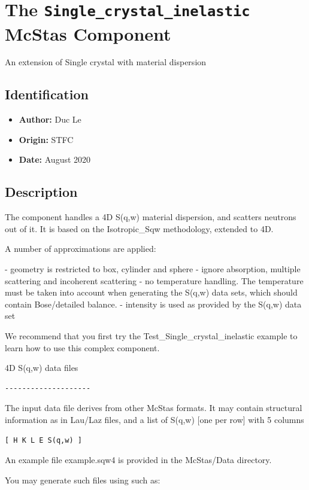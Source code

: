 \section{The \texttt{Single\_crystal\_inelastic} McStas Component}
An extension of Single crystal with material dispersion

\subsection*{Identification}
\begin{itemize}
  \item \textbf{Author:} Duc Le
  \item \textbf{Origin:} STFC
  \item \textbf{Date:} August 2020
\end{itemize}

\subsection*{Description}
The component handles a 4D S(q,w) material dispersion, and scatters neutrons out of it. It is based on the Isotropic\_Sqw methodology, extended to 4D.

A number of approximations are applied:

- geometry is restricted to box, cylinder and sphere - ignore absorption, multiple scattering and incoherent scattering - no temperature handling. The temperature must be taken into account when generating the S(q,w) data sets, which should contain Bose/detailed balance. - intensity is used as provided by the S(q,w) data set

We recommend that you first try the Test\_Single\_crystal\_inelastic example to learn how to use this complex component.

4D S(q,w) data files

\begin{verbatim}
--------------------
\end{verbatim}

The input data file derives from other McStas formats. It may contain structural information as in Lau/Laz files, and a list of S(q,w) [one per row] with 5 columns

\begin{verbatim}
[ H K L E S(q,w) ]
\end{verbatim}

An example file example.sqw4 is provided in the McStas/Data directory.

You may generate such files using  such as:

